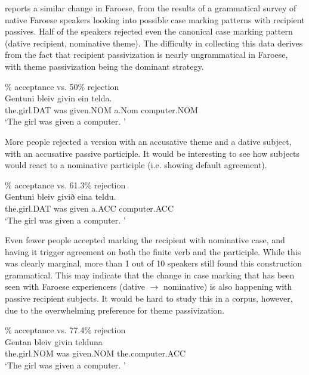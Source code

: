 \cite{Eyorsson.2012} reports a similar change in Faroese, from the results of a grammatical survey of native Faroese speakers looking into possible case marking patterns with recipient passives. Half of the speakers rejected even the canonical case marking pattern (dative recipient, nominative theme). The difficulty in collecting this data derives from the fact that recipient passivization is nearly ungrammatical in Faroese, with theme passivization being the dominant strategy.
\begin{exe}
\% acceptance vs. 50\% rejection\\
\gll Gentuni bleiv givin ein telda.\\
the.girl.DAT was given.NOM a.Nom computer.NOM\\
\trans `The girl was given a computer. \cite[ex 45a]{Eyorsson.2012}'
\end{exe}
More people rejected a version with an accusative theme and a dative subject, with an accusative passive participle. It would be interesting to see how subjects would react to a nominative participle (i.e. showing default agreement).
\begin{exe}
\% acceptance vs. 61.3\% rejection\\
\gll Gentuni bleiv givið eina teldu.\\
the.girl.DAT was given a.ACC computer.ACC\\
\trans `The girl was given a computer. \cite[ex 45b]{Eyorsson.2012}'
\end{exe}
Even fewer people accepted marking the recipient with nominative case, and having it trigger agreement on both the finite verb and the participle. While this was clearly marginal, more than 1 out of 10 speakers still found this construction grammatical.  This may indicate that the change in case marking that has been seen with Faroese experiencers (dative $\rightarrow$ nominative) is also happening with passive recipient subjects. It would be hard to study this in a corpus, however, due to the overwhelming preference for theme passivization.
\begin{exe}
\% acceptance vs. 77.4\% rejection\\
\gll Gentan bleiv givin telduna\\
the.girl.NOM was given.NOM the.computer.ACC\\
\trans `The girl was given a computer. \cite[ex 48b]{Eyorsson.2012}'
\end{exe}

